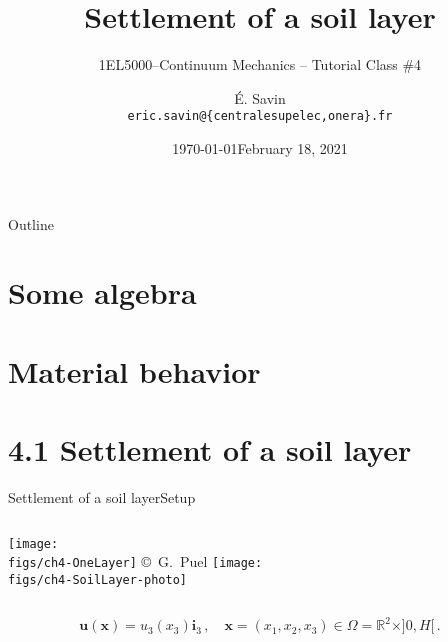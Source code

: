 \documentclass{beamer}
\title[1EL5000/S4]
{Settlement of a soil layer}
\subtitle{1EL5000--Continuum Mechanics -- Tutorial Class \#4} %
\author[\'E. Savin] %
{\'E. Savin\inst{1,2}\\ \scriptsize{\texttt{eric.savin@\{centralesupelec,onera\}.fr}}}%
\institute[Onera] %
{\inst{1}{Information Processing and Systems Dept.\\\Onera, France}
\and
 \inst{2}{Mechanical and Civil Engineering Dept.\\\ECP, France}}%
\date[]{\today}
\date[]{February 18, 2021}
\newcommand{\Rset}{\mathbb{R}}
\newcommand{\uj}{u}
\newcommand{\xj}{x}
\newcommand{\uv}{{\boldsymbol\uj}}
\newcommand{\xv}{{\boldsymbol\xj}}
\renewcommand{\ij}{i}
\newcommand{\iv}{{\boldsymbol\ij}}
\newcommand{\medium}{\Omega}
\begin{document}
\begin{frame}
  \titlepage
\end{frame}

\begin{frame}{Outline}
  \tableofcontents
\end{frame}




\section{Some algebra}



\section{Material behavior}



\section{4.1 Settlement of a soil layer}

\begin{frame}{Settlement of a soil layer}{Setup}

\begin{columns}[t]
\centering\texttt{[image: \\figs/ch4-OneLayer]}
\vskip-10pt{\hspace{2.9truecm}\mbox{\tiny{\copyright\ G. Puel}}}
\vskip-90pt
\centering\texttt{[image: \\figs/ch4-SoilLayer-photo]}
\end{columns}
\begin{displaymath}
\uv(\xv)=\uj_3(\xj_3)\iv_3\,,\quad\xv=(\xj_1,\xj_2,\xj_3)\in\medium=\Rset^2\times]0,H[\,.
\end{displaymath}

\end{frame}
\end{document}
